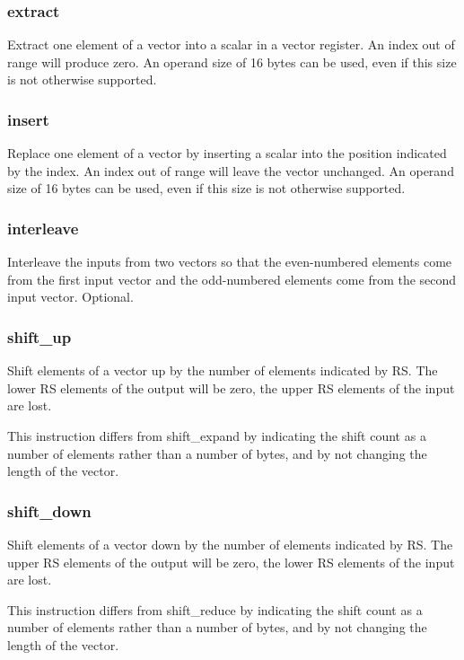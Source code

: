 \documentclass[forwardcom.tex]{subfiles}
\begin{document}
\subsubsection{extract}
Extract one element of a vector into a scalar in a vector register. An index out of range will produce zero. An operand size of 16 bytes can be used, even if this size is not otherwise supported.

\subsubsection{insert}
Replace one element of a vector by inserting a scalar into the position indicated by the index. An index out of range will leave the vector unchanged. An operand size of 16 bytes can be used, even if this size is not otherwise supported.

\subsubsection{interleave}
Interleave the inputs from two vectors so that the even-numbered elements come from the first input vector and the odd-numbered elements come from the second input vector. Optional.

\subsubsection{shift\_up}
Shift elements of a vector up by the number of elements indicated by RS. The lower RS elements of the output will be zero, the upper RS elements of the input are lost.
\vspace{2mm}

This instruction differs from shift\_expand by indicating the shift count as a number of elements rather than a number of bytes, and by not changing the length of the vector.

\subsubsection{shift\_down}
Shift elements of a vector down by the number of elements indicated by RS. The upper RS elements of the output will be zero, the lower RS elements of the input are lost.
\vspace{2mm}

This instruction differs from shift\_reduce by indicating the shift count as a number of elements rather than a number of bytes, and by not changing the length of the vector.
\end{document}
